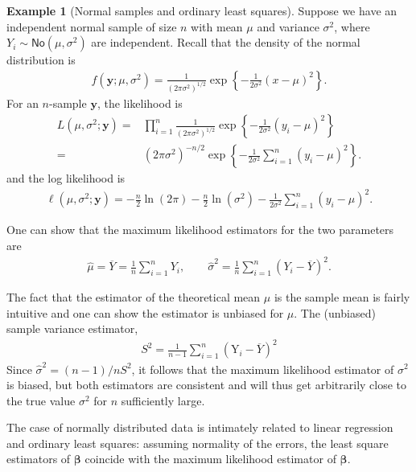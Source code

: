 \documentclass[
  11pt,
  letterpaper,
]{book}
\theoremstyle{definition}
\theoremstyle{definition}
\newtheorem{example}{Example}[chapter]
\theoremstyle{definition}
\theoremstyle{definition}
\theoremstyle{remark}
\begin{document}
\begin{example}[Normal samples and ordinary least squares]
\protect\hypertarget{exm:normal}{}\label{exm:normal}Suppose we have an independent normal sample of size \(n\) with mean \(\mu\) and variance \(\sigma^2\), where
\(Y_i \sim \mathsf{No}(\mu, \sigma^2)\) are independent.
Recall that the density of the normal distribution is
\begin{align*}
f(\boldsymbol{y}; \mu, \sigma^2)=\frac{1}{(2\pi \sigma^2)^{1/2}}\exp\left\{-\frac{1}{2\sigma^2}(x-\mu)^2\right\}.
\end{align*}
For an \(n\)-sample \(\boldsymbol{y}\), the likelihood is
\begin{align*}
L(\mu, \sigma^2; \boldsymbol{y})=&\prod_{i=1}^n\frac{1}{({2\pi \sigma^2})^{1/2}}\exp\left\{-\frac{1}{2\sigma^2}(y_i-\mu)^2\right\}\\
=&(2\pi \sigma^2)^{-n/2}\exp\left\{-\frac{1}{2\sigma^2}\sum_{i=1}^n(y_i-\mu)^2\right\}.
\end{align*}
and the log likelihood is
\begin{align*}
\ell(\mu, \sigma^2; \boldsymbol{y})=-\frac{n}{2}\ln(2\pi) -\frac{n}{2}\ln(\sigma^2)-\frac{1}{2\sigma^2}\sum_{i=1}^n (y_i-\mu)^2.
\end{align*}

One can show that the maximum likelihood estimators for the two parameters are
\begin{align*}
\widehat{\mu}=\overline{Y}=\frac{1}{n} \sum_{i=1}^n Y_i, \qquad \widehat{\sigma}^2=\frac{1}{n}\sum_{i=1}^n (Y_i-\overline{Y})^2.
\end{align*}

The fact that the estimator of the theoretical mean \(\mu\) is the sample mean is fairly intuitive and one can show the estimator is unbiased for \(\mu\). The (unbiased) sample variance estimator,
\begin{align*}
S^2=\frac{1}{n-1} \sum_{i=1}^n (\mathrm{Y}_i-\overline{Y})^2
\end{align*}
Since \(\widehat{\sigma}^2=(n-1)/n S^2\), it follows that the maximum likelihood estimator of \(\sigma^2\) is biased, but both estimators are consistent and will thus get arbitrarily close to the true value \(\sigma^2\) for \(n\) sufficiently large.

The case of normally distributed data is intimately related to linear regression and ordinary least squares: assuming normality of the errors, the least square estimators of \(\boldsymbol{\beta}\) coincide with the maximum likelihood estimator of \(\boldsymbol{\beta}\).


\end{example}
\end{document}

